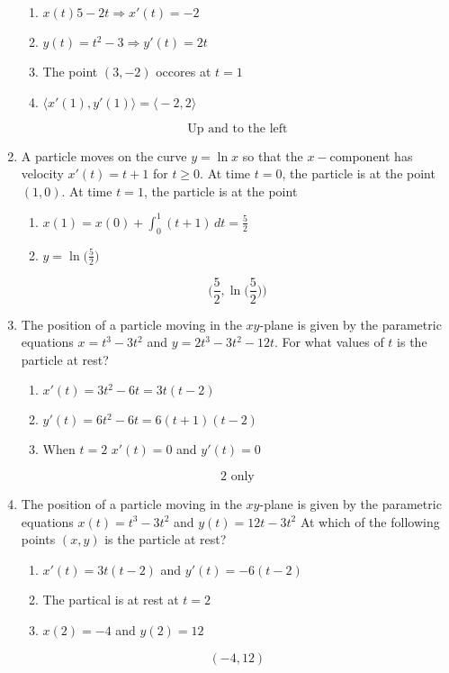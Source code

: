 \documentclass[12pt]{article}
\begin{document}
\begin{enumerate}
        \begin{enumerate}
            \item $x(t) 5-2t \Longrightarrow x'(t) = -2$
            \item $y(t) = t^2-3 \Longrightarrow y'(t) = 2t$
            \item The point $(3, -2)$ occores at $t = 1$
            \item $\langle x'(1), y'(1) \rangle  = \bigg\langle -2, 2\bigg\rangle$
        \end{enumerate}
        $$\boxed{\text{Up and to the left}}$$
        \item A particle moves on the curve $y=\ln x$ so that the $x-$component has velocity $x'(t)=t+1$ for $t \geq 0$. At time $t=0$, the particle is at the point $(1, 0)$. At time $t=1$, the particle is at the point 
        \begin{enumerate}
            \item $x(1) = x(0) + \int_{0}^{1} (t+1) \, dt = \frac{5}{2}$
            \item $y= \ln \bigg(\frac{5}{2}\bigg)$
        \end{enumerate}
        $$\boxed{\biggr(\frac{5}{2} ,\ln \bigg(\frac{5}{2}\bigg) \biggr)}$$
        \item The position of a particle moving in the $xy$-plane is given by the parametric equations $x = t^3 - 3t^2$ and $y = 2t^3 - 3t^2 - 12t$. For what values of $t$ is the particle at rest?
        \begin{enumerate}
            \item $x'(t) = 3t^2-6t = 3t(t-2)$
            \item $y'(t) = 6t^2 -6t = 6(t+1)(t-2)$
            \item When $t = 2$ $x'(t)= 0$ and $ y'(t) = 0$
        \end{enumerate}
        $$\boxed{\text{2 only}}$$
        \item The position of a particle moving in the $xy$-plane is given by the parametric equations $x(t)=t^3-3t^2$ and $y(t)=12t-3t^2$ At which of the following points $(x, y)$ is the particle at rest?
        \begin{enumerate}
            \item $x'(t) = 3t(t-2)$ and $y'(t) = -6(t-2)$
            \item The partical is at rest at $t=2$
            \item $x(2) = -4$ and $y(2)= 12$
        \end{enumerate}
        $$\boxed{(-4,12)}$$

\end{enumerate}
\end{document}
